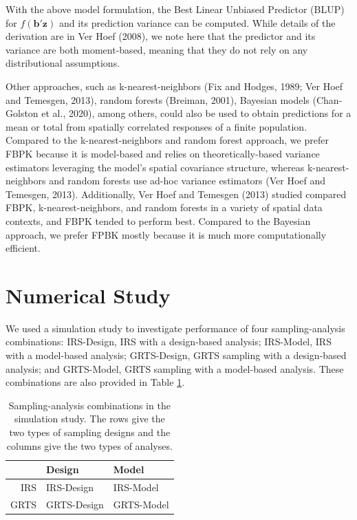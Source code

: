 \documentclass[]{elsarticle} %
\begin{document}
With the above model formulation, the Best Linear Unbiased Predictor
(BLUP) for \(f(\mathbf{b}'\mathbf{z})\) and its prediction variance can
be computed. While details of the derivation are in Ver Hoef (2008), we
note here that the predictor and its variance are both moment-based,
meaning that they do not rely on any distributional assumptions.

Other approaches, such as k-nearest-neighbors (Fix and Hodges, 1989; Ver
Hoef and Temesgen, 2013), random forests (Breiman, 2001), Bayesian
models (Chan-Golston et al., 2020), among others, could also be used to
obtain predictions for a mean or total from spatially correlated
responses of a finite population. Compared to the k-nearest-neighbors
and random forest approach, we prefer FBPK because it is model-based and
relies on theoretically-based variance estimators leveraging the model's
spatial covariance structure, whereas k-nearest-neighbors and random
forests use ad-hoc variance estimators (Ver Hoef and Temesgen, 2013).
Additionally, Ver Hoef and Temesgen (2013) studied compared FBPK,
k-nearest-neighbors, and random forests in a variety of spatial data
contexts, and FBPK tended to perform best. Compared to the Bayesian
approach, we prefer FPBK mostly because it is much more computationally
efficient.

\hypertarget{sec:numstudy}{%
\section{Numerical Study}\label{sec:numstudy}}

We used a simulation study to investigate performance of four
sampling-analysis combinations: IRS-Design, IRS with a design-based
analysis; IRS-Model, IRS with a model-based analysis; GRTS-Design, GRTS
sampling with a design-based analysis; and GRTS-Model, GRTS sampling
with a model-based analysis. These combinations are also provided in
Table \ref{tab:designanalysis}.

\begin{table}[ht]
\centering
\begin{tabular}{r|ll}
  \hline
 & Design & Model \\ 
  \hline
IRS & IRS-Design & IRS-Model \\ 
  GRTS & GRTS-Design & GRTS-Model \\ 
   \hline
\end{tabular}
\caption{\label{tab:designanalysis} Sampling-analysis combinations in the simulation study. The rows give the two types of sampling designs and the columns give the two types of analyses.} 
\end{table}
\end{document}

